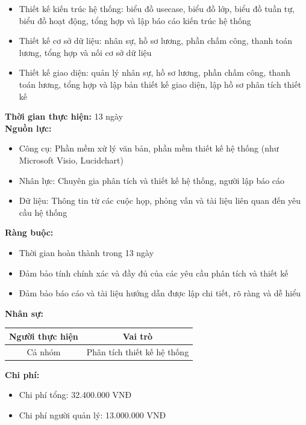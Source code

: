 {\begin{minipage}{\textwidth}
\begin{itemize}
        \item Thiết kế kiến trúc hệ thống: biểu đồ usecase, biểu đồ lớp, biểu đồ tuần tự, biểu đồ hoạt động, tổng hợp và lập báo cáo kiến trúc hệ thống
        \item Thiết kế cơ sở dữ liệu: nhân sự, hồ sơ lương, phần chấm công, thanh toán lương, tổng hợp và nối cơ sở dữ liệu
        \item Thiết kế giao diện: quản lý nhân sự, hồ sơ lương, phần chấm công, thanh toán lương, tổng hợp và lập bản thiết kế giao diện, lập hồ sơ phân tích thiết kế
    \end{itemize}
    \vspace{0.5cm}
    \noindent \textbf{Thời gian thực hiện:} 13 ngày \\
    \noindent \textbf{Nguồn lực:}
    \begin{itemize}
        \item Công cụ: Phần mềm xử lý văn bản, phần mềm thiết kế hệ thống (như Microsoft Visio, Lucidchart)
        \item Nhân lực: Chuyên gia phân tích và thiết kế hệ thống, người lập báo cáo
        \item Dữ liệu: Thông tin từ các cuộc họp, phỏng vấn và tài liệu liên quan đến yêu cầu hệ thống
    \end{itemize}
    \vspace{0.5cm}
    \noindent \textbf{Ràng buộc:}
    \begin{itemize}
        \item Thời gian hoàn thành trong 13 ngày
        \item Đảm bảo tính chính xác và đầy đủ của các yêu cầu phân tích và thiết kế
        \item Đảm bảo báo cáo và tài liệu hướng dẫn được lập chi tiết, rõ ràng và dễ hiểu
    \end{itemize}
    \vspace{0.5cm}
    \noindent \textbf{Nhân sự:}
    \begin{longtable}{|c|c|}
    \hline
    \textbf{Người thực hiện} & \textbf{Vai trò} \\
    \hline
    Cả nhóm & Phân tích thiết kế hệ thống \\
    \hline
    \end{longtable}
    \vspace{0.5cm}
    \noindent \textbf{Chi phí:}
    \begin{itemize}
        \item Chi phí tổng: 32.400.000 VNĐ
        \item Chi phí người quản lý: 13.000.000 VNĐ

\end{itemize}
\end{minipage}}
